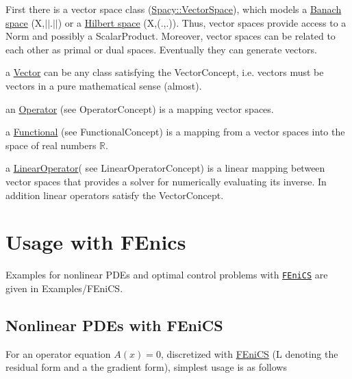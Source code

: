 \begin{DoxyItemize}
\item First there is a vector space class (\hyperlink{classSpacy_1_1VectorSpace}{Spacy\+::\+Vector\+Space}), which models a \hyperlink{namespaceSpacy_a0b66c8f2345b693504180dc7fb187958}{Banach space}  (X,$\vert$$\vert$.$\vert$$\vert$) or a \hyperlink{namespaceSpacy_a927756dd42df3e79c302df1f8f635b65}{Hilbert space}  (X,(.,.)). Thus, vector spaces provide access to a Norm and possibly a Scalar\+Product. Moreover, vector spaces can be related to each other as primal or dual spaces. Eventually they can generate vectors.
\item a \hyperlink{classSpacy_1_1Vector}{Vector} can be any class satisfying the Vector\+Concept, i.\+e. vectors must be vectors in a pure mathematical sense (almost).
\item an \hyperlink{classSpacy_1_1Operator}{Operator} (see Operator\+Concept) is a mapping vector spaces.
\item a \hyperlink{classSpacy_1_1Functional}{Functional} (see Functional\+Concept) is a mapping from a vector spaces into the space of real numbers $ \mathbb{R} $.
\item a \hyperlink{classSpacy_1_1LinearOperator}{Linear\+Operator}( see Linear\+Operator\+Concept) is a linear mapping between vector spaces that provides a solver for numerically evaluating its inverse. In addition linear operators satisfy the Vector\+Concept.
\end{DoxyItemize}\hypertarget{index_sec_usage_fenics}{}\section{Usage with F\+Enics}\label{index_sec_usage_fenics}
Examples for nonlinear P\+D\+Es and optimal control problems with \href{http://www.fenicsproject.org}{\tt F\+Eni\+CS} are given in Examples/\+F\+Eni\+CS.\hypertarget{index_sub_usage_fenics_pde}{}\subsection{Nonlinear P\+D\+Es with F\+Eni\+CS}\label{index_sub_usage_fenics_pde}
For an operator equation $A(x)=0$, discretized with \hyperlink{namespaceSpacy_1_1FEniCS}{F\+Eni\+CS} (\textquotesingle{}L\textquotesingle{} denoting the residual form and \textquotesingle{}a\textquotesingle{} the gradient form), simplest usage is as follows 
